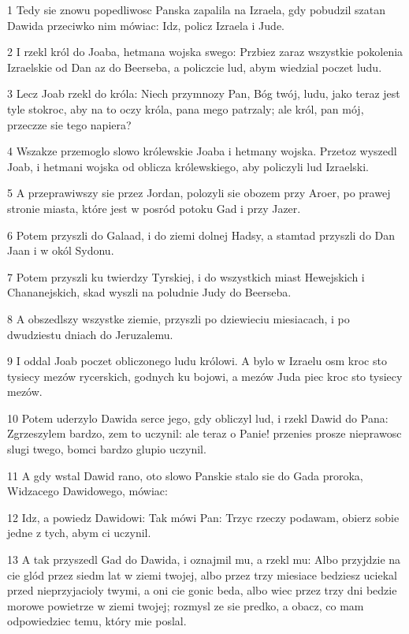 \par 1 Tedy sie znowu popedliwosc Panska zapalila na Izraela, gdy pobudzil szatan Dawida przeciwko nim mówiac: Idz, policz Izraela i Jude.
\par 2 I rzekl król do Joaba, hetmana wojska swego: Przbiez zaraz wszystkie pokolenia Izraelskie od Dan az do Beerseba, a policzcie lud, abym wiedzial poczet ludu.
\par 3 Lecz Joab rzekl do króla: Niech przymnozy Pan, Bóg twój, ludu, jako teraz jest tyle stokroc, aby na to oczy króla, pana mego patrzaly; ale król, pan mój, przeczze sie tego napiera?
\par 4 Wszakze przemoglo slowo królewskie Joaba i hetmany wojska. Przetoz wyszedl Joab, i hetmani wojska od oblicza królewskiego, aby policzyli lud Izraelski.
\par 5 A przeprawiwszy sie przez Jordan, polozyli sie obozem przy Aroer, po prawej stronie miasta, które jest w posród potoku Gad i przy Jazer.
\par 6 Potem przyszli do Galaad, i do ziemi dolnej Hadsy, a stamtad przyszli do Dan Jaan i w okól Sydonu.
\par 7 Potem przyszli ku twierdzy Tyrskiej, i do wszystkich miast Hewejskich i Chananejskich, skad wyszli na poludnie Judy do Beerseba.
\par 8 A obszedlszy wszystke ziemie, przyszli po dziewieciu miesiacach, i po dwudziestu dniach do Jeruzalemu.
\par 9 I oddal Joab poczet obliczonego ludu królowi. A bylo w Izraelu osm kroc sto tysiecy mezów rycerskich, godnych ku bojowi, a mezów Juda piec kroc sto tysiecy mezów.
\par 10 Potem uderzylo Dawida serce jego, gdy obliczyl lud, i rzekl Dawid do Pana: Zgrzeszylem bardzo, zem to uczynil: ale teraz o Panie! przenies prosze nieprawosc slugi twego, bomci bardzo glupio uczynil.
\par 11 A gdy wstal Dawid rano, oto slowo Panskie stalo sie do Gada proroka, Widzacego Dawidowego, mówiac:
\par 12 Idz, a powiedz Dawidowi: Tak mówi Pan: Trzyc rzeczy podawam, obierz sobie jedne z tych, abym ci uczynil.
\par 13 A tak przyszedl Gad do Dawida, i oznajmil mu, a rzekl mu: Albo przyjdzie na cie glód przez siedm lat w ziemi twojej, albo przez trzy miesiace bedziesz uciekal przed nieprzyjacioly twymi, a oni cie gonic beda, albo wiec przez trzy dni bedzie morowe powietrze w ziemi twojej; rozmysl ze sie predko, a obacz, co mam odpowiedziec temu, który mie poslal.
